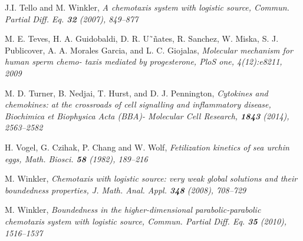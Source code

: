 \documentclass[12pt,reqno]{amsart}
\begin{document}
\begin{thebibliography}{[MT]}
 J.I. Tello and M. Winkler, \it A chemotaxis system with logistic source, \rm Commun. Partial Diff. Eq. {\bf 32} (2007),
849--877

 M. E. Teves, H. A. Guidobaldi, D. R. U˜\~nates, R. Sanchez, W. Miska, S. J. Publicover,
A. A. Morales Garcia, and L. C. Giojalas, \it Molecular mechanism for human sperm chemo-
taxis mediated by progesterone, \rm PloS one, 4(12):e8211, 2009


  M. D. Turner, B. Nedjai, T. Hurst, and D. J. Pennington, \it Cytokines and chemokines:
at the crossroads of cell signalling and inflammatory disease, \rm  Biochimica et Biophysica Acta (BBA)-
Molecular Cell Research, {\bf 1843} (2014), 2563--2582






 H. Vogel, G. Czihak, P. Chang and W. Wolf, \it Fetilization kinetics of sea urchin eggs, \rm Math. Biosci. {\bf 58}
(1982), 189--216

 M. Winkler, \it Chemotaxis with logistic source: very weak global solutions and their boundedness properties, \rm
J. Math. Anal. Appl. {\bf  348} (2008), 708--729

 M. Winkler, \it Boundedness in the higher-dimensional parabolic-parabolic chemotaxis system with logistic
source, \rm Commun. Partial Diff. Eq. {\bf 35} (2010), 1516--1537



\end{thebibliography}
\end{document}
